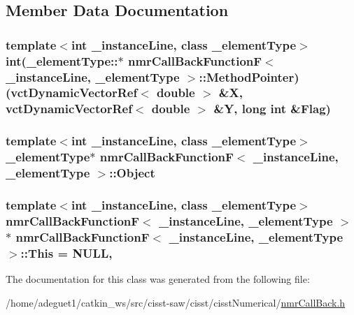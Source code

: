 \subsection{Member Data Documentation}
\hypertarget{classnmr_call_back_function_f_aea3dda0eedac298284708f16895a3a9f}{
\subsubsection[{Method\-Pointer}]{\setlength{\rightskip}{0pt plus 5cm}template$<$int \-\_\-instance\-Line, class \-\_\-element\-Type$>$ int(\-\_\-element\-Type\-::$\ast$ {\bf nmr\-Call\-Back\-Function\-F}$<$ \-\_\-instance\-Line, \-\_\-element\-Type $>$\-::Method\-Pointer)({\bf vct\-Dynamic\-Vector\-Ref}$<$ double $>$ \&X, {\bf vct\-Dynamic\-Vector\-Ref}$<$ double $>$ \&Y, long int \&Flag)\hspace{0.3cm}{\ttfamily [protected]}}}\label{classnmr_call_back_function_f_aea3dda0eedac298284708f16895a3a9f}
\hypertarget{classnmr_call_back_function_f_af32244c85b446c1724460470280b999f}{
\subsubsection[{Object}]{\setlength{\rightskip}{0pt plus 5cm}template$<$int \-\_\-instance\-Line, class \-\_\-element\-Type$>$ \-\_\-element\-Type$\ast$ {\bf nmr\-Call\-Back\-Function\-F}$<$ \-\_\-instance\-Line, \-\_\-element\-Type $>$\-::Object\hspace{0.3cm}{\ttfamily [protected]}}}\label{classnmr_call_back_function_f_af32244c85b446c1724460470280b999f}
\hypertarget{classnmr_call_back_function_f_aade0d68710d0883015d2908fcd831b82}{
\subsubsection[{This}]{\setlength{\rightskip}{0pt plus 5cm}template$<$int \-\_\-instance\-Line, class \-\_\-element\-Type$>$ {\bf nmr\-Call\-Back\-Function\-F}$<$ \-\_\-instance\-Line, \-\_\-element\-Type $>$ $\ast$ {\bf nmr\-Call\-Back\-Function\-F}$<$ \-\_\-instance\-Line, \-\_\-element\-Type $>$\-::This = N\-U\-L\-L\hspace{0.3cm}{\ttfamily [static]}, {\ttfamily [protected]}}}\label{classnmr_call_back_function_f_aade0d68710d0883015d2908fcd831b82}


The documentation for this class was generated from the following file\-:\begin{DoxyCompactItemize}
\item 
/home/adeguet1/catkin\-\_\-ws/src/cisst-\/saw/cisst/cisst\-Numerical/\hyperlink{nmr_call_back_8h}{nmr\-Call\-Back.\-h}\end{DoxyCompactItemize}
